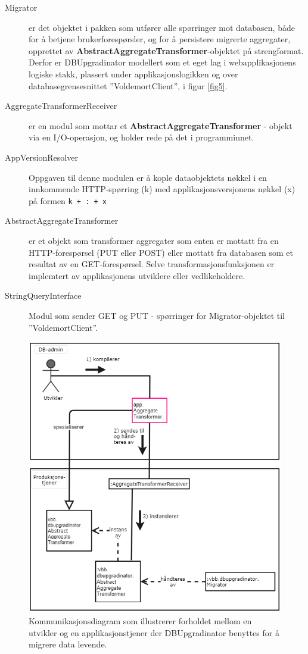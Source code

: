\begin{description}
  \item [Migrator] er det objektet i pakken som utfører alle spørringer mot databasen, både for å betjene brukerforespørsler, og for å persistere migrerte aggregater, opprettet av \textbf{Abstract}\-\textbf{Aggregate}\-\textbf{Transformer}-objektet på strengformat. Derfor er DBUpgradinator modellert som et eget lag i webapplikasjonens logiske stakk, plassert under applikasjonslogikken og over databasegrensesnittet ''VoldemortClient'', i figur \ref{fig5}.
  \item [AggregateTransformerReceiver] er en modul som mottar et \textbf{AbstractAggregateTransformer} - objekt via en I/O-operasjon, og holder rede på det i programminnet.
  \item [AppVersionResolver] Oppgaven til denne modulen er å kople dataobjektets nøkkel i en innkommende HTTP-spørring (k) med applikasjonsversjonens nøkkel (x) på formen \texttt{k + : + x}
  \item [AbstractAggregateTransformer] er et objekt som transformer aggregater som enten er mottatt fra en HTTP-forespørsel (PUT eller POST) eller mottatt fra databasen som et resultat av en GET-forespørsel. Selve transformasjonsfunksjonen er implemtert av applikasjonens utviklere eller vedlikeholdere.
  \item [StringQueryInterface] Modul som sender GET og PUT - spørringer for Migrator-objektet til ''VoldemortClient''.
\end{description}

\begin{figure}[hbtp]
  \centering
  \includegraphics[scale=0.6]{fig/dbupgradinator-logisk-2.png}
  \caption{Kommunikasjonsdiagram som illustrerer forholdet mellom en utvikler og en applikasjonstjener der DBUpgradinator benyttes for å migrere data levende.}
  \label{fig6}
\end{figure}

